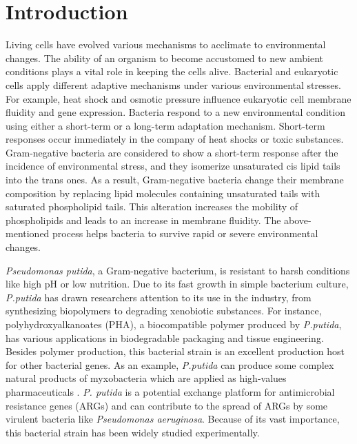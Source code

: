 \section{Introduction}

Living cells have evolved various mechanisms to acclimate to environmental changes. 
The ability of an organism to become accustomed to new ambient conditions plays a vital role in keeping the cells alive. 
Bacterial and eukaryotic cells apply different adaptive mechanisms under various environmental stresses. 
For example, heat shock and osmotic pressure influence eukaryotic cell membrane fluidity and gene expression\cite{los2004membrane}.
Bacteria respond to a new environmental condition using either a short-term or a long-term adaptation mechanism. 
Short-term responses occur immediately in the company of heat shocks or toxic substances\cite{eberlein2018immediate}.
Gram-negative bacteria are considered to show a short-term response after the incidence of environmental stress, and they isomerize unsaturated cis lipid tails into the trans ones. As a result, Gram-negative bacteria change their membrane composition by replacing lipid molecules containing unsaturated tails with saturated phospholipid tails\cite{eberlein2018immediate,heipieper1992conversion,okuyama1991cis}.
This alteration increases the mobility of phospholipids and leads to an increase in membrane fluidity. The above-mentioned process helps bacteria to survive rapid or severe environmental changes. 

\emph{Pseudomonas putida}, a Gram-negative bacterium, is resistant to harsh conditions like high pH or low nutrition\cite{poblete2012industrial,timmis2002pseudomonas}.
Due to its fast growth in simple bacterium culture, \emph{P.putida} has drawn researchers attention to its use in the industry, from synthesizing biopolymers to degrading xenobiotic substances. 
For instance, polyhydroxyalkanoates (PHA), a biocompatible polymer produced by \emph{P.putida}, has various applications in biodegradable packaging and tissue engineering\cite{poblete2012industrial}.
Besides polymer production, this bacterial strain is an excellent production host for other bacterial genes. As an example, \emph{P.putida} can produce some complex natural products of myxobacteria which are applied as high-values pharmaceuticals \cite{wenzel2005heterologous,gross2005posttranslational}. 
\emph{P. putida} is a potential exchange platform for antimicrobial resistance genes (ARGs) and can contribute to the spread of ARGs by some virulent bacteria like \emph{Pseudomonas aeruginosa}.\cite{peter2017genomic}
Because of its vast importance, this bacterial strain has been widely studied experimentally.\cite{tohya2022whole,martinez2022evaluation,wang2009production,kulkarni2006biodegradation,martinez2014pseudomonas} 

